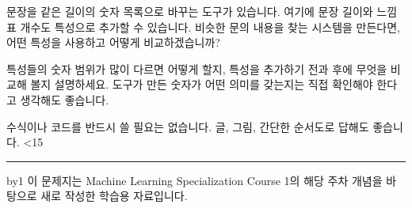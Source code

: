 \documentclass[11pt,a4paper]{article}
\newcommand{\answerlines}[1]{\foreachline{#1}}
\newcommand{\foreachline}[1]{\linecount=0\loop\ifnum\linecount<#1\vspace{8mm}\par{\color{rulegray}\hrule}\advance\linecount by1\repeat}
\begin{document}
문장을 같은 길이의 숫자 목록으로 바꾸는 도구가 있습니다. 여기에 문장 길이와 느낌표 개수도 특성으로 추가할 수 있습니다. 비슷한 문의 내용을 찾는 시스템을 만든다면, 어떤 특성을 사용하고 어떻게 비교하겠습니까?
\par\vspace{3mm}
특성들의 숫자 범위가 많이 다르면 어떻게 할지, 특성을 추가하기 전과 후에 무엇을 비교해 볼지 설명하세요. 도구가 만든 숫자가 어떤 의미를 갖는지는 직접 확인해야 한다고 생각해도 좋습니다.
\par\vspace{3mm}
{\small 수식이나 코드를 반드시 쓸 필요는 없습니다. 글, 그림, 간단한 순서도로 답해도 좋습니다.}
\answerlines{15}
\vfill{\footnotesize 이 문제지는 Machine Learning Specialization Course 1의 해당 주차 개념을 바탕으로 새로 작성한 학습용 자료입니다.}
\end{document}
